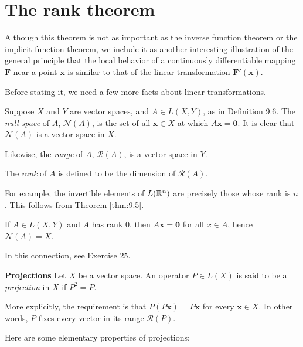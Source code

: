 
\section{The rank theorem}

Although this theorem is not as important as the inverse function theorem or
the implicit function theorem, we include it as another interesting illustration
of the general principle that the local behavior of a continuously differentiable
mapping $\mathbf{F}$ near a point $\mathbf{x}$ is similar to that of the linear transformation $\mathbf{F'(x)}$.

Before stating it, we need a few more facts about linear transformations.

\begin{myDef}
    \label{myDef:9.30}
    Suppose $X$ and $Y$ are vector spaces, and $A \in L( X, Y)$, as in Definition 9.6. 
    The \emph{null space} of $A$, $\mathscr{N}(A)$, 
    is the set of all $\mathbf{x} \in X$ at which $A \mathbf{x = 0}$.
    It is clear that $\mathscr{N}(A)$ is a vector space in $X$.
    
    Likewise, the \emph{range} of $A$, $\mathscr{R}(A)$, is a vector space in $Y$.

    The \emph{rank} of $A$ is defined to be the dimension of $\mathscr{R}(A)$.
    
    For example, the invertible elements of $L({\protect\mathbb R}^n)$ are precisely those whose rank is $n$. This follows from Theorem \ref{thm:9.5}.
    
    If $A \in L(X, Y)$ and $A$ has rank 0, 
    then $A \mathbf{x = 0}$ for all $x \in A$, 
    hence $\mathscr{N}(A) = X$.
    
    In this connection, see Exercise 25.
\end{myDef}

\begin{myDef}
    \textbf{{\color{blue} Projections}}
    Let $X$ be a vector space. An operator $P\in L(X)$ is said to be
    a \emph{projection} in $X$ if $P^2 = P$.

    More explicitly, the requirement is that $P(P \mathbf{x}) = P \mathbf{x}$ for every $\mathbf{x} \in X$. 
    In other words, $P$ fixes every vector in its range $\mathscr{R}(P)$.
\end{myDef}

Here are some elementary properties of projections:



